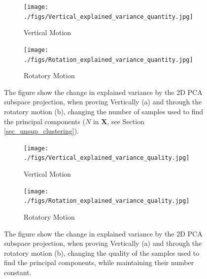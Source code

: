 \documentclass[]{interact}
\theoremstyle{plain}%
\theoremstyle{definition}
\theoremstyle{remark}
\begin{document}
\begin{minipage}{\textwidth}
	\begin{figure}[H]
		\centering
		\begin{subfigure}[b]{.48\textwidth}
			\texttt{[image: ./figs/Vertical\_explained\_variance\_quantity.jpg]}
			\caption{Vertical Motion}
			\label{inf_retention_quantity:vertical}
		\end{subfigure}
		\begin{subfigure}[b]{.48\textwidth}
			\texttt{[image: ./figs/Rotation\_explained\_variance\_quantity.jpg]}
			\caption{Rotatory Motion}
			\label{inf_retention_quantity:Rotation}
		\end{subfigure}
		\caption{The figure show the change in explained variance by the 2D PCA subspace projection, when proving Vertically (a) and through the rotatory motion (b), changing the number of samples used to find the principal components ($N$ in $\mathbf{X}$, see Section \ref{sec_unsup_clustering}). }
		\label{inf_retention_quantity}
	\end{figure}
	\begin{figure}[H]
		\centering
		\begin{subfigure}[b]{.48\textwidth}
			\texttt{[image: ./figs/Vertical\_explained\_variance\_quality.jpg]}
			\caption{Vertical Motion}
			\label{inf_retention_quality:vertical}
		\end{subfigure}
		\begin{subfigure}[b]{.48\textwidth}
			\texttt{[image: ./figs/Rotation\_explained\_variance\_quality.jpg]}
			\caption{Rotatory Motion}
			\label{inf_retention_quality:Rotation}
		\end{subfigure}
		\caption{The figure show the change in explained variance by the 2D PCA subspace projection, when proving Vertically (a) and through the rotatory motion (b), changing the quality of the samples used to find the principal components, while maintaining their number constant. }
		\label{inf_retention_quality}
	\end{figure}
\hfill\\
\end{minipage}
\end{document}
